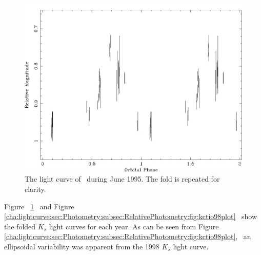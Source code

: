 \begin{figure}[!htb]
\begin{center}
\includegraphics[width=5.0in]{kctio95plot}
\caption{%
The light curve of \groj\ during June 1995.
The fold is repeated for clarity. %
}
\label{cha:lightcurve:sec:Photometry:subsec:RelativePhotometry:fig:kctio95plot}
\end{center}
\end{figure}

\vspace{\myparskip}

Figure~%
\ref{cha:lightcurve:sec:Photometry:subsec:RelativePhotometry:fig:kctio95plot}%
\ and Figure~%
\ref{cha:lightcurve:sec:Photometry:subsec:RelativePhotometry:fig:kctio98plot}%
\ show the folded $K_s$ light curves for each year. As can be seen from Figure~%
\ref{cha:lightcurve:sec:Photometry:subsec:RelativePhotometry:fig:kctio98plot},%
\ an ellipsoidal variability was apparent from the 1998 $K_s$ light curve. %

